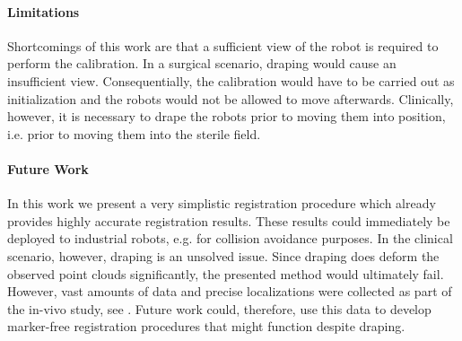 \paragraph{Limitations} Shortcomings of this work are that a sufficient view of the robot is required to perform the calibration. In a surgical scenario, draping would cause an insufficient view. Consequentially, the calibration would have to be carried out as initialization and the robots would not be allowed to move afterwards. Clinically, however, it is necessary to drape the robots prior to moving them into position, i.e. prior to moving them into the sterile field.

\paragraph{Future Work} In this work we present a very simplistic registration procedure which already provides highly accurate registration results. These results could immediately be deployed to industrial robots, e.g. for collision avoidance purposes. In the clinical scenario, however, draping is an unsolved issue. Since draping does deform the observed point clouds significantly, the presented method would ultimately fail. However, vast amounts of data and precise localizations were collected as part of the in-vivo study, see . Future work could, therefore, use this data to develop marker-free registration procedures that might function despite draping.

